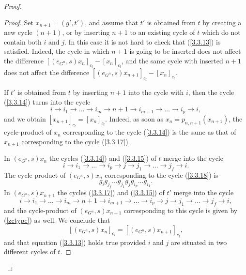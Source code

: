 \documentclass[10pt,a4paper]{amsart}
\begin{document}
\begin{proof}
\begin{proof}
Set $x_{n+1}=\left(g',t'\right)$, and assume that $t'$ is obtained from $t$ by creating a new cycle $(n+1)$, or by inserting $n+1$ to an existing cycle of $t$ which do not contain both $i$ and $j$. In this case it is not hard to check that (\ref{3.3.13}) is satisfied.
Indeed, the cycle in which $n+1$ is going to be inserted does not affect the difference
$\left[\left(e_{G^n},s\right)x_n\right]_{c_l}-\left[x_n\right]_{c_l}$, and the same cycle with inserted $n+1$ does not affect the difference
$\left[\left(e_{G^n},s\right)x_{n+1}\right]_{c_l}-\left[x_n\right]_{c_l}$.

If $t'$ is obtained from $t$ by inserting $n+1$ into the cycle with $i$, then  the cycle (\ref{3.3.14})
turns into the cycle
\begin{equation}\label{3.3.17}
i\rightarrow i_1\rightarrow\ldots\rightarrow i_m\rightarrow n+1\rightarrow i_{m+1}\rightarrow
\ldots\rightarrow i_p\rightarrow i,
\end{equation}
and we obtain $\left[x_{n+1}\right]_{c_l}=\left[x_n\right]_{c_l}$.  Indeed,
as soon as $x_n=p_{n,n+1}\left(x_{n+1}\right)$,
the cycle-product of $x_n$ corresponding to the cycle (\ref{3.3.14}) is the same as that of $x_{n+1}$ corresponding to the cycle
 (\ref{3.3.17}).

In $\left(e_{G^n},s\right)x_n$ the cycles (\ref{3.3.14}) and (\ref{3.3.15}) of $t$ merge into the cycle
\begin{equation}\label{3.3.18}
i\rightarrow i_1\rightarrow\ldots\rightarrow i_p\rightarrow j\rightarrow j_{1}\rightarrow
\ldots\rightarrow j_f\rightarrow i.
\end{equation}
The cycle-product of $\left(e_{G^n},s\right)x_n$ corresponding to the cycle (\ref{3.3.18})
is
\begin{equation}\label{zctype}
g_ig_{j_f}\ldots g_{j_1}g_{j}g_{i_p}\ldots g_{i_1}.
\end{equation}
In $\left(e_{G^n},s\right)x_{n+1}$ the cycles (\ref{3.3.17}) and (\ref{3.3.15}) of $t'$ merge into the cycle
\begin{equation}\label{3.3.19}
i\rightarrow i_1\rightarrow\ldots\rightarrow i_m\rightarrow n+1\rightarrow i_{m+1}\rightarrow
\ldots\rightarrow i_p\rightarrow j\rightarrow j_1\rightarrow \ldots\rightarrow j_f\rightarrow i,
\end{equation}
and the cycle-product of $\left(e_{G^n},s\right)x_{n+1}$ corresponding to this cycle is given by
(\ref{zctype}) as well. We conclude that
\begin{equation}\label{Zvzbv}
\left[\left(e_{G^n},s\right)x_{n}\right]_{c_l}=\left[\left(e_{G^n},s\right)x_{n+1}\right]_{c_l},
\end{equation}
and that equation (\ref{3.3.13}) holds true provided $i$ and $j$ are situated in two different cycles of $t$.


\end{proof}
\end{proof}
\end{document}
